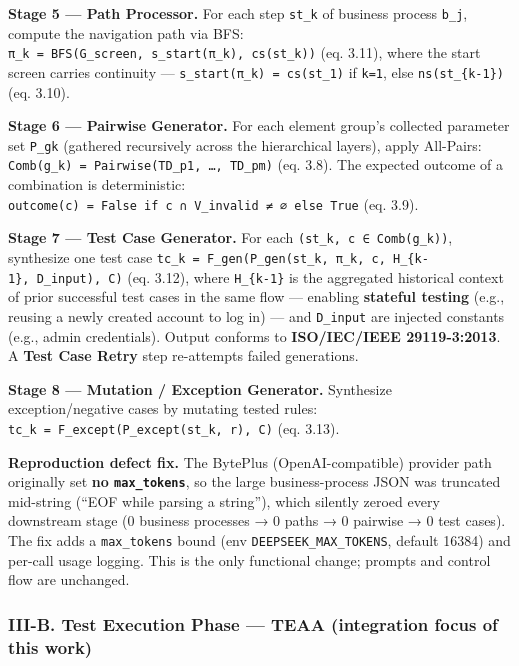 \documentclass[
]{article}
\begin{document}
\textbf{Stage 5 --- Path Processor.} For each step \texttt{st\_k} of
business process \texttt{b\_j}, compute the navigation path via BFS:
\texttt{π\_k\ =\ BFS(G\_screen,\ s\_start(π\_k),\ cs(st\_k))} (eq.
3.11), where the start screen carries continuity ---
\texttt{s\_start(π\_k)\ =\ cs(st\_1)} if \texttt{k=1}, else
\texttt{ns(st\_\{k-1\})} (eq. 3.10).

\textbf{Stage 6 --- Pairwise Generator.} For each element group's
collected parameter set \texttt{P\_gk} (gathered recursively across the
hierarchical layers), apply All-Pairs:
\texttt{Comb(g\_k)\ =\ Pairwise(TD\_p1,\ …,\ TD\_pm)} (eq. 3.8). The
expected outcome of a combination is deterministic:
\texttt{outcome(c)\ =\ False\ if\ c\ ∩\ V\_invalid\ ≠\ ∅\ else\ True}
(eq. 3.9).

\textbf{Stage 7 --- Test Case Generator.} For each
\texttt{(st\_k,\ c\ ∈\ Comb(g\_k))}, synthesize one test case
\texttt{tc\_k\ =\ F\_gen(P\_gen(st\_k,\ π\_k,\ c,\ H\_\{k-1\},\ D\_input),\ C)}
(eq. 3.12), where \texttt{H\_\{k-1\}} is the aggregated historical
context of prior successful test cases in the same flow --- enabling
\textbf{stateful testing} (e.g., reusing a newly created account to log
in) --- and \texttt{D\_input} are injected constants (e.g., admin
credentials). Output conforms to \textbf{ISO/IEC/IEEE 29119-3:2013}. A
\textbf{Test Case Retry} step re-attempts failed generations.

\textbf{Stage 8 --- Mutation / Exception Generator.} Synthesize
exception/negative cases by mutating tested rules:
\texttt{tc\textquotesingle{}\_k\ =\ F\_except(P\_except(st\_k,\ r),\ C)}
(eq. 3.13).

\textbf{Reproduction defect fix.} The BytePlus (OpenAI-compatible)
provider path originally set \textbf{no \texttt{max\_tokens}}, so the
large business-process JSON was truncated mid-string (``EOF while
parsing a string''), which silently zeroed every downstream stage (0
business processes → 0 paths → 0 pairwise → 0 test cases). The fix adds
a \texttt{max\_tokens} bound (env \texttt{DEEPSEEK\_MAX\_TOKENS},
default 16384) and per-call usage logging. This is the only functional
change; prompts and control flow are unchanged.

\subsubsection{III-B. Test Execution Phase --- TEAA (integration focus
of this
work)}\label{iii-b.-test-execution-phase-teaa-integration-focus-of-this-work}
\end{document}
